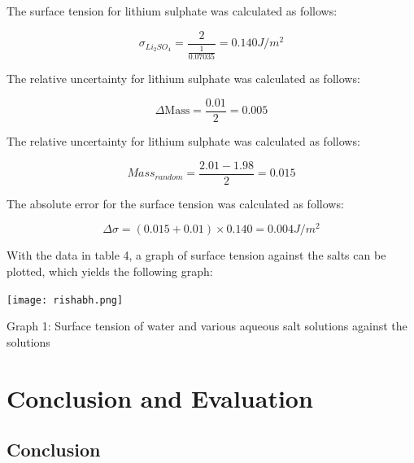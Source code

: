 \documentclass{article}
\begin{document}
\par{The surface tension for lithium sulphate was calculated as follows:}

\begin{equation*}
    \sigma_{Li_2SO_4} = \frac{2}{\frac{1}{0.07035}} = 0.140 J/m^2 
\end{equation*}

\par{The relative uncertainty for lithium sulphate was calculated as follows: }

\begin{equation*}
    \Delta \text{Mass} = \frac{0.01}{2} = 0.005 
\end{equation*}

\par{The relative uncertainty for lithium sulphate was calculated as follows: }

\begin{equation*}
    Mass_{random} = \frac{2.01-1.98}{2} = 0.015 
\end{equation*}

\par{The absolute error for the surface tension was calculated as follows:}

\begin{equation*}
    \Delta \sigma = (0.015 + 0.01) \times 0.140 = 0.004 J/m^2
\end{equation*}

\par{With the data in table 4, a graph of surface tension against the salts can be plotted, which yields the following graph:}

\begin{center}
    \texttt{[image: rishabh.png]}
    \par{Graph 1: Surface tension of water and various aqueous salt solutions against the solutions}
\end{center}

\section{Conclusion and Evaluation}

\subsection{Conclusion}
\end{document}
